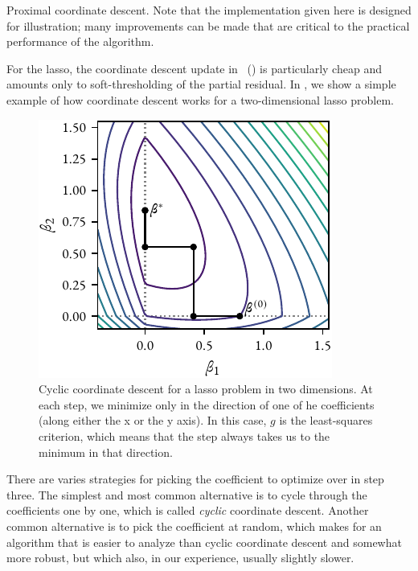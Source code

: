\begin{algorithm}[hbtp]
  \caption{Proximal coordinate descent. Note that the implementation given here is designed for illustration; many improvements can be made that are critical to the practical performance of the algorithm.}
  \label{alg:pcd}
\end{algorithm}

For the lasso, the coordinate descent update in ~() is particularly cheap and amounts only to soft-thresholding of the partial residual. In , we show a simple example of how coordinate descent works for a two-dimensional lasso problem.

\begin{figure}[htpb]
  \centering
  \includegraphics[]{figures/cd.pdf}
  \caption{%
    Cyclic coordinate descent for a lasso problem in two dimensions. At each step, we minimize only in the direction of one of he coefficients (along either the x or the y axis). In this case, \(g\) is the least-squares criterion, which means that the step always takes us to the minimum in that direction.
  }
  \label{fig:pcd-lasso}
\end{figure}

There are varies strategies for picking the coefficient to optimize over in step three. The simplest and most common alternative is to cycle through the coefficients one by one, which is called \emph{cyclic} coordinate descent. Another common alternative is to pick the coefficient at random, which makes for an algorithm that is easier to analyze than cyclic coordinate descent and somewhat more robust, but which also, in our experience, usually slightly slower.

